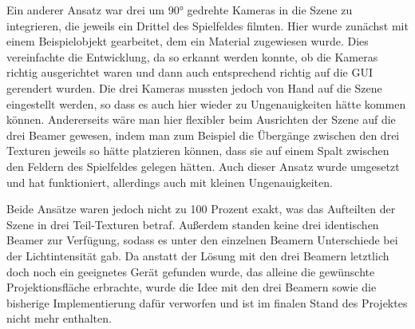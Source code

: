 Ein anderer Ansatz war drei um 90° gedrehte Kameras in die Szene zu integrieren, die jeweils ein Drittel des Spielfeldes filmten. Hier wurde zunächst mit einem Beispielobjekt gearbeitet, dem ein Material zugewiesen wurde. Dies vereinfachte die Entwicklung, da so erkannt werden konnte, ob die Kameras richtig ausgerichtet waren und dann auch entsprechend richtig auf die GUI gerendert wurden. Die drei Kameras mussten jedoch von Hand auf die Szene eingestellt werden, so dass es auch hier wieder zu Ungenauigkeiten hätte kommen können. Andererseits wäre man hier flexibler beim Ausrichten der Szene auf die drei Beamer gewesen, indem man zum Beispiel die Übergänge zwischen den drei Texturen jeweils so hätte platzieren können, dass sie auf einem Spalt zwischen den Feldern des Spielfeldes gelegen hätten. Auch dieser Ansatz wurde umgesetzt und hat funktioniert, allerdings auch mit kleinen Ungenauigkeiten.

Beide Ansätze waren jedoch nicht zu 100 Prozent exakt, was das Aufteilten der Szene in drei Teil-Texturen betraf. Außerdem standen keine drei identischen Beamer zur Verfügung, sodass es unter den einzelnen Beamern Unterschiede bei der Lichtintensität gab. Da anstatt der Lösung mit den drei Beamern letztlich doch noch ein geeignetes Gerät gefunden wurde, das alleine die gewünschte Projektionsfläche erbrachte, wurde die Idee mit den drei Beamern sowie die bisherige Implementierung dafür verworfen und ist im finalen Stand des Projektes nicht mehr enthalten.